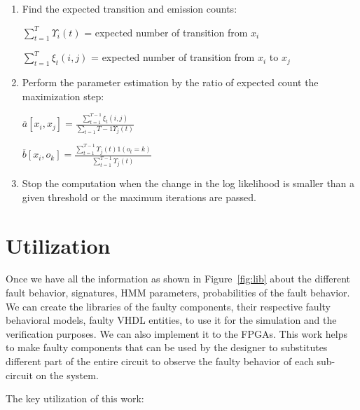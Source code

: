 \begin{enumerate}
\begin{itemize}
\end{itemize}
\item Find the expected transition and emission counts:

$\sum\limits_{t = 1}^{ T } \Upsilon_i (t)$ = expected number of transition from $x_i$

$\sum\limits_{t = 1}^{ T} \xi_t (i ,j)$ = expected number of transition from $x_i$ to $x_j$

\item Perform the parameter estimation by the ratio of expected count the maximization step:


$\overline{a}[x_i, x_j] = \frac{\sum\limits_{t = 1}^{T - 1}\xi_{t} (i, j)}{\sum\limits_{t = 1} T - 1 \Upsilon_{j}(t)} $




$\overline{b}[x_i, o_k] = \frac{\sum\limits_{t = 1}^{T - 1}\Upsilon_{j} (t) 1 (o_t = k)}{\sum\limits_{t = 1}^{T - 1} \Upsilon_{j}(t)} $

\item Stop the computation when the change in the log likelihood is smaller than a given threshold or the maximum iterations are passed.

\end{enumerate} 















\section{Utilization}



Once we have all the information as shown in Figure~\ref{fig:lib} about the different fault behavior, signatures, HMM parameters, probabilities of the fault behavior. We can create the libraries of the faulty components, their respective faulty behavioral models, faulty VHDL entities, to use it for the simulation and the verification purposes. We can also implement it to the FPGAs. This work helps to make faulty components that can be used by the designer to substitutes different part of the entire circuit to observe the faulty behavior of each sub-circuit on the system.


The key utilization of this work:

